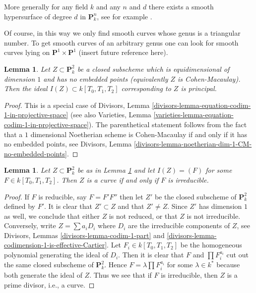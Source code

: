 \documentclass{stacks-project}
\theoremstyle{plain}
\newtheorem{lemma}[subsection]{Lemma}
\theoremstyle{definition}
\theoremstyle{remark}
\numberwithin{equation}{subsection}
\begin{document}
\medskip\noindent
More generally for any field $k$ and any $n$ and $d$ there exists
a smooth hypersurface of degree $d$ in $\mathbf{P}^n_k$, see
for example \cite{Poonen}.

\medskip\noindent
Of course, in this way we only find smooth curves whose genus
is a triangular number. To get smooth curves of an arbitrary
genus one can look for smooth curves lying on
$\mathbf{P}^1 \times \mathbf{P}^1$ (insert future reference here).

\begin{lemma}
\label{lemma-equation-plane-curve}
Let $Z \subset \mathbf{P}^2_k$ be a closed subscheme which
is equidimensional of dimension $1$ and has no embedded points
(equivalently $Z$ is Cohen-Macaulay).
Then the ideal $I(Z) \subset k[T_0, T_1, T_2]$ corresponding
to $Z$ is principal.
\end{lemma}

\begin{proof}
This is a special case of
Divisors, Lemma \ref{divisors-lemma-equation-codim-1-in-projective-space}
(see also Varieties, Lemma
\ref{varieties-lemma-equation-codim-1-in-projective-space}).
The parenthetical statement follows from the fact that a
$1$ dimensional Noetherian scheme is Cohen-Macaulay
if and only if it has no embedded points, see
Divisors, Lemma \ref{divisors-lemma-noetherian-dim-1-CM-no-embedded-points}.
\end{proof}

\begin{lemma}
\label{lemma-plane-curve}
Let $Z \subset \mathbf{P}^2_k$ be as in Lemma \ref{lemma-equation-plane-curve}
and let $I(Z) = (F)$ for some $F \in k[T_0, T_1, T_2]$.
Then $Z$ is a curve if and only if $F$ is irreducible.
\end{lemma}

\begin{proof}
If $F$ is reducible, say $F = F' F''$ then let $Z'$ be the closed subscheme
of $\mathbf{P}^2_k$ defined by $F'$. It is clear that $Z' \subset Z$
and that $Z' \not = Z$. Since $Z'$ has dimension $1$ as well, we conclude
that either $Z$ is not reduced, or that $Z$ is not irreducible.
Conversely, write $Z = \sum a_i D_i$ where $D_i$ are the irreducible
components of $Z$, see
Divisors, Lemmas \ref{divisors-lemma-codim-1-part} and
\ref{divisors-lemma-codimension-1-is-effective-Cartier}.
Let $F_i \in k[T_0, T_1, T_2]$ be the homogeneous
polynomial generating the ideal of $D_i$. Then it is clear that
$F$ and $\prod F_i^{a_i}$ cut out the same closed subscheme of
$\mathbf{P}^2_k$. Hence $F = \lambda \prod F_i^{a_i}$ for some
$\lambda \in k^*$ because both generate the ideal of $Z$.
Thus we see that if $F$ is irreducible, then $Z$ is
a prime divisor, i.e., a curve.
\end{proof}
\end{document}
